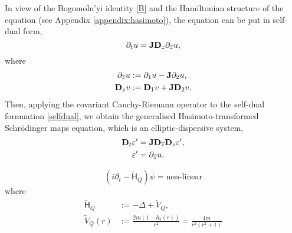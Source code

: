 

In view of the Bogomoln'yi identity \eqref{B} and the Hamiltonian structure of the equation (see Appendix \ref{appendix:hasimoto}), the equation can be put in self-dual form,
    \begin{equation}
        \partial_t u 
            = {\bf J} {\bf D}_z \partial_{\overline z} u,\label{eq:selfdual}
    \end{equation}
where 
    \begin{align*}
        \partial_{\overline z} u  
            &:= \partial_1 u - {\bf J} \partial_2 u ,\\
        {\bf D}_z v 
            &:= {\bf D}_1 v + {\bf J} {\bf D}_2 v. 
    \end{align*}
Then, applying the covariant Cauchy-Riemann operator to the self-dual formuation \eqref{selfdual}, we obtain the generalised Hasimoto-transformed Schr\"odinger maps equation, which is an elliptic-dispersive system,
    \begin{equation}
        \begin{split}
        {\bf D}_t \varepsilon'
            &= {\bf J} {\bf D}_{\overline z} {\bf D}_z \varepsilon',\\
        \varepsilon'
            &= \partial_{\overline z} u . 
        \end{split}
    \end{equation}
    

    \begin{equation}
        (i \partial_t - \widetilde{\mathsf H}_Q) \psi = \text{non-linear}
    \end{equation}
where 
    \begin{align*}
        \widetilde{\mathsf H}_Q 
            &:= - \Delta + \widetilde{V}_Q,\\
        \widetilde{V}_Q (r)
            &:= \frac{2m(1 - h_3(r))}{r^2} = \frac{4m}{r^2 (r^2 + 1)}
    \end{align*}